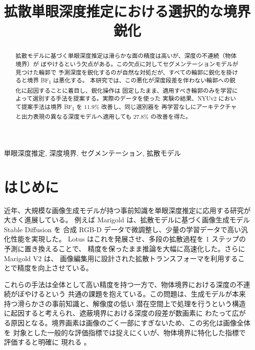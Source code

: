 \documentclass[conference]{IEEEtran}
\newcommand{\bfone}{BF\textsubscript{1}}
\begin{document}
\title{拡散単眼深度推定における選択的な境界鋭化}

\author{
}

\maketitle

\begin{abstract}
拡散モデルに基づく単眼深度推定は滑らかな面の精度は高いが、深度の不連続（物体境界）が
ぼやけるという欠点がある。この欠点に対してセグメンテーションモデルが見つけた輪郭で
予測深度を鋭化するのが自然な対処だが、すべての輪郭に鋭化を掛けると境界 \bfone{} は悪化する。
本研究では、この悪化が深度段差を伴わない輪郭への鋭化に起因することに着目し、鋭化操作は
固定したまま、適用すべき輪郭のみを学習によって選別する手法を提案する。実際のデータを使った
実験の結果、NYUv2 において提案手法は境界 \bfone{} を 11.9\% 改善し、同じ選別器を
再学習なしにアーキテクチャと出力表現の異なる深度モデルへ適用しても 27.8\% の改善を得た。
\end{abstract}

\begin{IEEEkeywords}
単眼深度推定, 深度境界, セグメンテーション, 拡散モデル
\end{IEEEkeywords}

\section{はじめに}

近年、大規模な画像生成モデルが持つ事前知識を単眼深度推定に応用する研究が大きく進展している。
例えば Marigold \cite{marigold} は、拡散モデルに基づく画像生成モデル Stable Diffusion を
合成 RGB-D データで微調整し、少量の学習データで高い汎化性能を実現した。
Lotus \cite{lotus} はこれを発展させ、多段の拡散過程を 1 ステップの予測に置き換えることで、
精度を保ったまま推論を大幅に高速化した。さらに Marigold V2 \cite{marigoldv2} は、
画像編集用に設計された拡散トランスフォーマを利用することで精度を向上させている。

これらの手法は全体として高い精度を持つ一方で、物体境界における深度の不連続がぼやけるという
共通の課題を抱えている。この問題は、生成モデルが本来持つ滑らかさの事前知識と、解像度の低い
潜在空間上で処理を行うという構造に起因すると考えられ、遮蔽境界における深度の段差が数画素に
わたって広がる原因となる。境界画素は画像のごく一部にすぎないため、この劣化は画像全体を
対象とした一般的な評価指標では捉えにくいが、物体境界に特化した指標で評価すると明確に
現れる \cite{depthpro}。
\end{document}
